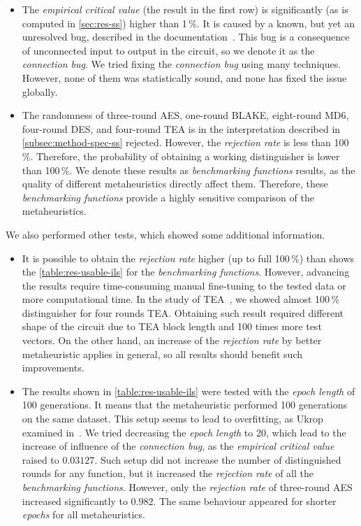 \documentclass[
  print, %
  Table,   %
  nolof,     %
  nolot,     %
  11pt, %
  oneside  %
]{fithesis3}
\begin{document}
\begin{itemize}
    \item The \textit{empirical critical value} (the result in the first row) is significantly (as is computed in \cref{sec:res-ss}) higher than 1\,\%. It is caused by a known, but yet an unresolved bug, described in the documentation~\cite{EACirc-wiki-bug}. This bug is a consequence of unconnected input to output in the circuit, so we denote it as the \textit{connection bug}. We tried fixing the \textit{connection bug} using many techniques. However, none of them was statistically sound, and none has fixed the issue globally.
    \item The randomness of three-round AES, one-round BLAKE, eight-round MD6, four-round DES, and four-round TEA is in the interpretation described in \cref{subsec:method-spec-ss} rejected. However, the \textit{rejection rate} is less than 100\,\%. Therefore, the probability of obtaining a working distinguisher is lower than 100\,\%. We denote these results as \textit{benchmarking functions} results, as the quality of different metaheuristics directly affect them. Therefore, these \textit{benchmarking functions} provide a highly sensitive comparison of the metaheuristics.
\end{itemize}

We also performed other tests, which showed some additional information.

\begin{itemize}
    \item It is possible to obtain the \textit{rejection rate} higher (up to full 100\,\%) than shows the \cref{table:res-usable-ils} for the \textit{benchmarking functions}. However, advancing the results require time-consuming manual fine-tuning to the tested data or more computational time. In the study of TEA~\cite{kubicek2016new}, we showed almost 100\,\% distinguisher for four rounds TEA. Obtaining such result required different shape of the circuit due to TEA block length and 100 times more test vectors. On the other hand, an increase of the \textit{rejection rate} by better metaheuristic applies in general, so all results should benefit such improvements.
    
    \item The results shown in \cref{table:res-usable-ils} were tested with the \textit{epoch length} of 100 generations. It means that the metaheuristic performed 100 generations on the same dataset. This setup seems to lead to overfitting, as Ukrop examined in~\cite[Section~7.1]{ukropBcThesis}. We tried decreasing the \textit{epoch length} to 20, which lead to the increase of influence of the \textit{connection bug}, as the \textit{empirical critical value} raised to $0.03127$. Such setup did not increase the number of distinguished rounds for any function, but it increased the \textit{rejection rate} of all the \textit{benchmarking functions}. However, only the \textit{rejection rate} of three-round AES increased significantly to $0.982$. The same behaviour appeared for shorter \textit{epochs} for all metaheuristics.
\end{itemize}
\end{document}
